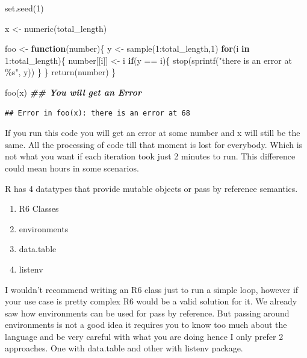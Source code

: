 \documentclass[
]{book}
\newenvironment{Shaded}{\begin{snugshade}}{\end{snugshade}}
\newcommand{\ControlFlowTok}[1]{\textcolor[rgb]{0.13,0.29,0.53}{\textbf{#1}}}
\newcommand{\DecValTok}[1]{\textcolor[rgb]{0.00,0.00,0.81}{#1}}
\newcommand{\DocumentationTok}[1]{\textcolor[rgb]{0.56,0.35,0.01}{\textbf{\textit{#1}}}}
\newcommand{\FunctionTok}[1]{\textcolor[rgb]{0.00,0.00,0.00}{#1}}
\newcommand{\NormalTok}[1]{#1}
\newcommand{\OtherTok}[1]{\textcolor[rgb]{0.56,0.35,0.01}{#1}}
\newcommand{\SpecialCharTok}[1]{\textcolor[rgb]{0.00,0.00,0.00}{#1}}
\newcommand{\StringTok}[1]{\textcolor[rgb]{0.31,0.60,0.02}{#1}}
\providecommand{\tightlist}{%
  \setlength{\itemsep}{0pt}\setlength{\parskip}{0pt}}
\begin{document}
\begin{Shaded}
\begin{Highlighting}[]
\FunctionTok{set.seed}\NormalTok{(}\DecValTok{1}\NormalTok{)}

\NormalTok{x }\OtherTok{\textless{}{-}} \FunctionTok{numeric}\NormalTok{(total\_length)}

\NormalTok{foo }\OtherTok{\textless{}{-}} \ControlFlowTok{function}\NormalTok{(number)\{}
\NormalTok{  y }\OtherTok{\textless{}{-}} \FunctionTok{sample}\NormalTok{(}\DecValTok{1}\SpecialCharTok{:}\NormalTok{total\_length,}\DecValTok{1}\NormalTok{)}
  \ControlFlowTok{for}\NormalTok{(i }\ControlFlowTok{in} \DecValTok{1}\SpecialCharTok{:}\NormalTok{total\_length)\{}
\NormalTok{    number[[i]] }\OtherTok{\textless{}{-}}\NormalTok{ i}
    \ControlFlowTok{if}\NormalTok{(y }\SpecialCharTok{==}\NormalTok{ i)\{}
      \FunctionTok{stop}\NormalTok{(}\FunctionTok{sprintf}\NormalTok{(}\StringTok{"there is an error at \%s"}\NormalTok{, y))}
\NormalTok{    \}}
\NormalTok{  \}}
  \FunctionTok{return}\NormalTok{(number)}
\NormalTok{\}}

\FunctionTok{foo}\NormalTok{(x) }\DocumentationTok{\#\# You will get an Error}
\end{Highlighting}
\end{Shaded}

\begin{verbatim}
## Error in foo(x): there is an error at 68
\end{verbatim}

If you run this code you will get an error at some number and x will still be the same. All the processing of code till that moment is lost for everybody. Which is not what you want if each iteration took just 2 minutes to run. This difference could mean hours in some scenarios.

R has 4 datatypes that provide mutable objects or pass by reference semantics.

\begin{enumerate}
\def\labelenumi{\arabic{enumi}.}
\tightlist
\item
  R6 Classes
\item
  environments
\item
  data.table
\item
  listenv
\end{enumerate}

I wouldn't recommend writing an R6 class just to run a simple loop, however if your use case is pretty complex R6 would be a valid solution for it. We already saw how environments can be used for pass by reference. But passing around environments is not a good idea it requires you to know too much about the language and be very careful with what you are doing hence I only prefer 2 approaches. One with data.table and other with listenv package.
\end{document}
